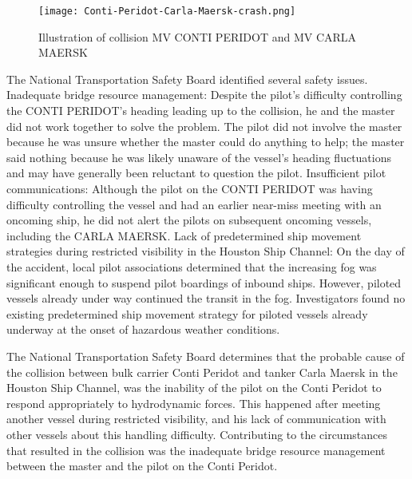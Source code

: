 \begin{figure}[p]
	\centering
	\texttt{[image: Conti-Peridot-Carla-Maersk-crash.png]}
	\caption{Illustration of collision MV CONTI PERIDOT and MV CARLA MAERSK}
	\label{fig:Conti-Peridot-Carla-Maersk-crash}
\end{figure}

The National Transportation Safety Board identified several safety issues. Inadequate bridge resource management: Despite the pilot’s difficulty controlling the CONTI PERIDOT’s heading leading up to the collision, he and the master did not work together to solve the problem. The pilot did not involve the master because he was unsure whether the master could do anything to help; the master said nothing because he was likely unaware of the vessel’s heading fluctuations and may have generally been reluctant to question the pilot.
Insufficient pilot communications: Although the pilot on the CONTI PERIDOT was having difficulty controlling the vessel and had an earlier near-miss meeting with an oncoming ship, he did not alert the pilots on subsequent oncoming vessels, including the CARLA MAERSK.
Lack of predetermined ship movement strategies during restricted visibility in the Houston Ship Channel: On the day of the accident, local pilot associations determined that the increasing fog was significant enough to suspend pilot boardings of inbound ships. However, piloted vessels already under way continued the transit in the fog. Investigators found no existing predetermined ship movement strategy for piloted vessels already underway at the onset of hazardous weather conditions.

The National Transportation Safety Board determines that the probable cause of the collision between bulk carrier Conti Peridot and tanker Carla Maersk in the Houston Ship Channel, was the inability of the pilot on the Conti Peridot to respond appropriately to hydrodynamic forces. This happened after meeting another vessel during restricted visibility, and his lack of communication with other vessels about this handling difficulty. Contributing to the circumstances that resulted in the collision was the inadequate bridge resource management between the master and the pilot on the Conti Peridot. \cite{NTSB2016}\cite{NTSB2016a}

